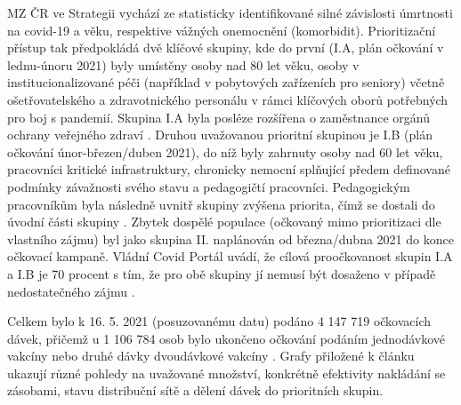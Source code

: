 MZ ČR ve Strategii vychází ze statisticky identifikované silné závislosti úmrtnosti na covid-19 a věku, respektive vážných onemocnění (komorbidit). Prioritizační přístup tak předpokládá dvě klíčové skupiny, kde do první (I.A, plán očkování v lednu-únoru 2021) byly umístěny osoby nad 80 let věku, osoby v institucionalizované péči (například v pobytových zařízeních pro seniory) včetně ošetřovatelského a zdravotnického personálu v rámci klíčových oborů potřebných pro boj s pandemií. Skupina I.A byla posléze rozšířena o zaměstnance orgánů ochrany veřejného zdraví \cite{prioritizace_hygiena}. 
%
Druhou uvažovanou prioritní skupinou je I.B (plán očkování únor-březen/duben 2021), do níž byly zahrnuty osoby nad 60 let věku, pracovníci kritické infrastruktury, chronicky nemocní splňující předem definované podmínky závažnosti svého stavu a pedagogičtí pracovníci. %
Pedagogickým pracovníkům byla následně uvnitř skupiny zvýšena priorita, čímž se dostali do úvodní části skupiny \cite{prioritizace_ockovani}. Zbytek dospělé populace (očkovaný mimo prioritizaci dle vlastního zájmu) byl jako skupina II. naplánován od března/dubna 2021 do konce očkovací kampaně. Vládní Covid Portál uvádí, že cílová proočkovanost skupin I.A a I.B je 70 procent s tím, že pro obě skupiny jí nemusí být dosaženo v případě nedostatečného zájmu \cite{kdoprvni}.

Celkem bylo k 16. 5. 2021 (posuzovanému datu) podáno 4 147 719 očkovacích dávek, přičemž u 1 106 784 osob bylo ukončeno očkování podáním jednodávkové vakcíny nebo druhé dávky dvoudávkové vakcíny \cite{mzcr_data}. Grafy přiložené k článku ukazují různé pohledy na uvažované množství, konkrétně efektivity nakládání se zásobami, stavu distribuční sítě a dělení dávek do prioritních skupin.



